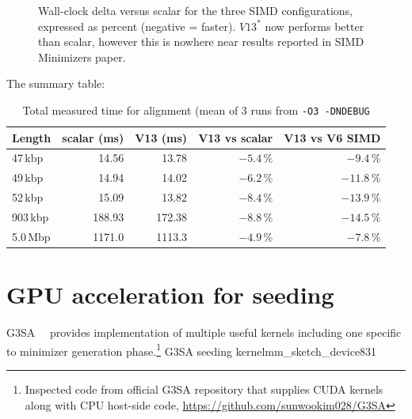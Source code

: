 \begin{figure}[H]
  \caption{Wall-clock delta versus scalar for the three
    SIMD configurations, expressed as percent (negative = faster).
    ${V13}^{*}$ now performs better than scalar, however this is nowhere near results reported in SIMD Minimizers paper.}
  \label{fig:speedup-summary}
\end{figure}

The summary table:

\begin{table}[H]
  \centering
  \small
  \begin{tabular}{lrrrr}
    \toprule
    Length     & scalar (ms) & V13 (ms) & V13 vs scalar & V13 vs V6 SIMD \\
    \midrule
    47\,kbp   &  14.56  & 13.78 & $-5.4\,\%$ & $-9.4\,\%$ \\
    49\,kbp   &  14.94  & 14.02 & $-6.2\,\%$ & $-11.8\,\%$ \\
    52\,kbp   &  15.09  & 13.82 & $-8.4\,\%$ & $-13.9\,\%$ \\
    903\,kbp  & 188.93  & 172.38 & $-8.8\,\%$ & $-14.5\,\%$ \\
    5.0\,Mbp  & 1171.0  & 1113.3 & $-4.9\,\%$ & $-7.8\,\%$ \\
    \bottomrule
  \end{tabular}
  \caption{Total measured time for alignment
    (mean of 3 runs from
    \texttt{-O3 -DNDEBUG}}
  \label{tab:final-numbers}
\end{table}

\section{GPU acceleration for seeding}

G3SA~~\cite{g3sa_paper} provides implementation of multiple useful kernels including one specific to minimizer generation phase.\footnote{Inspected code from official G3SA repository that supplies CUDA kernels along with CPU host-side code,
\url{https://github.com/sunwookim028/G3SA}}%
  {G3SA seeding kernel}{mm_sketch_device}{83}{1}

